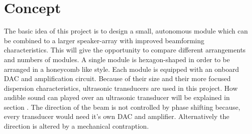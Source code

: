 \chapter{Concept}\label{sec:concept}


The basic idea of this project is to design a small, autonomous module which can be combined to a larger speaker-array with improved beamforming characteristics. This will give the opportunity to compare different arrangements and numbers of modules. A single module is hexagon-shaped in order to be arranged in a honeycomb like style. Each module is equipped with an onboard DAC and amplification circuit.\p
Because of their size and their more focused dispersion characteristics, ultrasonic transducers are used in this project. How audible sound can played over an ultrasonic transducer will be explained in section .\p
The direction of the beam is not controlled by phase shifting because, every transducer would need it's own DAC and amplifier. Alternatively the direction is altered by a mechanical contraption.